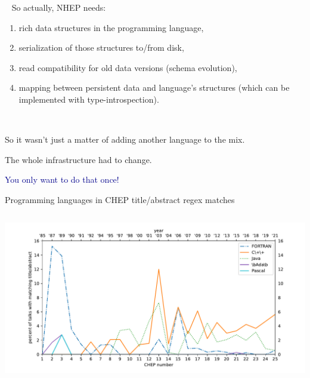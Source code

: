 \documentclass[aspectratio=169]{beamer}
\begin{document}
\begin{frame}{\mbox{ }}
\Large
\vspace{0.25 cm}
So actually, NHEP needs:

\vspace{0.25 cm}
\begin{enumerate}\setlength{\itemsep}{0.15 cm}
\item rich data structures in the programming language,
\item serialization of those structures to/from disk,
\item read compatibility for old data versions (schema evolution),
\item mapping between persistent data and language's structures (which can be implemented with type-introspection).
\end{enumerate}

\large
\vspace{0.5 cm}

\vspace{0.25 cm}

\vspace{0.25 cm}
\end{frame}

\begin{frame}{\mbox{ }}
\vspace{0.35 cm}
\Large
\begin{center}
So it wasn't just a matter of adding another language to the mix.

\vspace{1 cm}
The whole infrastructure had to change.

\vspace{1 cm}
\textcolor{darkblue}{You only want to do that once!}
\end{center}
\end{frame}

\begin{frame}{Programming languages in CHEP title/abstract regex matches}
\vspace{0.15 cm}
\begin{columns}
\includegraphics[width=\linewidth]{PLOTS/chep-papers-language-1.pdf}
\end{columns}
\end{frame}
\end{document}

